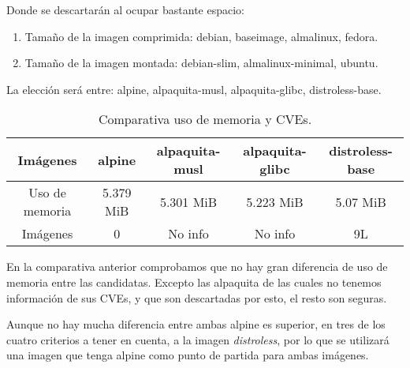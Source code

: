 Donde se descartarán al ocupar bastante espacio:
\begin{enumerate}
    \item Tamaño de la imagen comprimida: debian, baseimage, almalinux, fedora.
    \item Tamaño de la imagen montada: debian-slim, almalinux-minimal, ubuntu.
\end{enumerate}

La elección será entre: alpine, alpaquita-musl, alpaquita-glibc, distroless-base.

\begin{table}[H]
    \centering
    \begin{adjustbox}{width=\textwidth, totalheight=\textheight, keepaspectratio}
        \begin{tabular}{|c|c|c|c|c|}
        \hline
        Imágenes & alpine & alpaquita-musl & alpaquita-glibc & distroless-base \\
        \hline
        Uso de memoria & 5.379 MiB & 5.301 MiB & 5.223 MiB & 5.07 MiB \\
        \hline
        Imágenes & 0 & No info & No info & 9L \\
        \end{tabular}
    \end{adjustbox}
    \caption{Comparativa uso de memoria y CVEs.}
\end{table}

En la comparativa anterior comprobamos que no hay gran diferencia de uso de memoria entre las candidatas. Excepto las alpaquita de las cuales no tenemos información de sus CVEs, y que son descartadas por esto, el resto son seguras.

Aunque no hay mucha diferencia entre ambas alpine es superior, en tres de los cuatro criterios a tener en cuenta, a la imagen \textit{distroless}, por lo que se utilizará una imagen que tenga alpine como punto de partida para ambas imágenes. 
